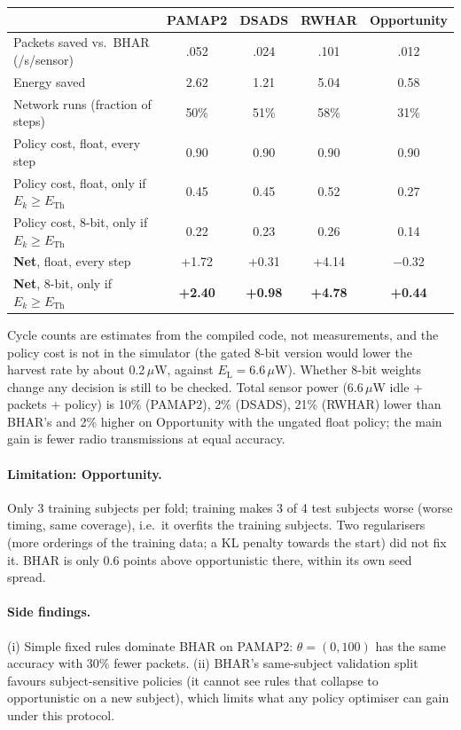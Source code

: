 \documentclass[10pt]{article}
\newcommand{\Eth}{E_{\mathrm{Th}}}
\newcommand{\EL}{E_{\mathrm{L}}}
\begin{document}
\begin{center}\small
\begin{tabular}{lcccc}
\toprule
 & PAMAP2 & DSADS & RWHAR & Opportunity \\
\midrule
Packets saved vs.\ BHAR (/s/sensor) & .052 & .024 & .101 & .012 \\
Energy saved & 2.62 & 1.21 & 5.04 & 0.58 \\
Network runs (fraction of steps) & 50\% & 51\% & 58\% & 31\% \\
Policy cost, float, every step & 0.90 & 0.90 & 0.90 & 0.90 \\
Policy cost, float, only if $E_k \ge \Eth$ & 0.45 & 0.45 & 0.52 & 0.27 \\
Policy cost, 8-bit, only if $E_k \ge \Eth$ & 0.22 & 0.23 & 0.26 & 0.14 \\
\midrule
\textbf{Net}, float, every step & +1.72 & +0.31 & +4.14 & $-$0.32 \\
\textbf{Net}, 8-bit, only if $E_k \ge \Eth$ & \textbf{+2.40} & \textbf{+0.98} & \textbf{+4.78} & \textbf{+0.44} \\
\bottomrule
\end{tabular}
\end{center}

Cycle counts are estimates from the compiled code, not measurements, and the policy cost is not in the simulator (the gated 8-bit version would lower the harvest rate by about 0.2\,$\mu$W, against $\EL = 6.6$\,$\mu$W). Whether 8-bit weights change any decision is still to be checked. Total sensor power (6.6\,$\mu$W idle + packets + policy) is 10\% (PAMAP2), 2\% (DSADS), 21\% (RWHAR) lower than BHAR's and 2\% higher on Opportunity with the ungated float policy; the main gain is fewer radio transmissions at equal accuracy.

\paragraph{Limitation: Opportunity.} Only 3 training subjects per fold; training makes 3 of 4 test subjects worse (worse timing, same coverage), i.e.\ it overfits the training subjects. Two regularisers (more orderings of the training data; a KL penalty towards the start) did not fix it. BHAR is only 0.6 points above opportunistic there, within its own seed spread.

\paragraph{Side findings.} (i) Simple fixed rules dominate BHAR on PAMAP2: $\theta=(0,100)$ has the same accuracy with 30\% fewer packets. (ii) BHAR's same-subject validation split favours subject-sensitive policies (it cannot see rules that collapse to opportunistic on a new subject), which limits what any policy optimiser can gain under this protocol.
\end{document}
